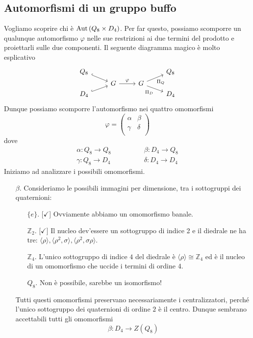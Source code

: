 \subsection{Automorfismi di un gruppo buffo}
\begin{multicols}{2}
	Vogliamo scoprire chi è $ \mathrm{Aut}\left( Q_8 \times D_4 \right) $. Per far questo, possiamo scomporre un qualunque automorfismo $ \varphi $ nelle sue restrizioni ai due termini del prodotto e proiettarli sulle due componenti. Il seguente diagramma magico è molto esplicativo
	\[ \begin{tikzcd}[row sep = 0.05 cm]
	Q_8 \arrow[swap, hook]{dr}{} & & & Q_8 \\
	 & G \arrow{r}{\varphi} & G \arrow[swap]{ur}{\Pi_Q}\arrow[swap]{dr}{\Pi_D} & \\
	D_4 \arrow[swap, hook]{ur}{} &  &  & D_4
	\end{tikzcd}\]
	Dunque possiamo scomporre l'automorfismo nei quattro omomorfismi
	\[ \varphi= \left(\begin{matrix}
	\alpha & \beta \\
	\gamma & \delta \\
	\end{matrix}\right) \]
	dove 
	\begin{align*}
		\alpha: Q_8 \rightarrow Q_8 \qquad & \qquad \beta: D_4 \rightarrow Q_8 \\
		\gamma: Q_8 \rightarrow D_4 \qquad & \qquad \delta: D_4 \rightarrow D_4
	\end{align*}
	 Iniziamo ad analizzare i possibili omomorfismi.
	 \begin{itemize}
	 	\item [$ \beta $.] Consideriamo le possibili immagini per dimensione, tra i sottogruppi dei quaternioni:
	 	\begin{itemize}
	 		\item [$\{e\}  $.][$ \checkmark $] Ovviamente abbiamo un omomorfismo banale.
	 		\item [$ \mathbb{Z}_2 $.][$ \checkmark $] Il nucleo dev'essere un sottogruppo di indice 2 e il diedrale ne ha tre: $ \langle \rho \rangle, \langle \rho^2, \sigma \rangle, \langle \rho^2, \sigma\rho \rangle $.
	 		\item [$ \mathbb{Z}_4 $.] L'unico sottogruppo di indice $ 4 $ del diedrale è $ \langle \rho \rangle \cong \mathbb{Z}_4 $ ed è il nucleo di un omomorfismo che uccide i termini di ordine $ 4 $.
	 		\item [$ Q_8 $.] Non è possibile, sarebbe un isomorfismo!
	 	\end{itemize}
	 	Tutti questi omomorfismi preservano necessariamente i centralizzatori, perché l'unico sottogruppo dei quaternioni di ordine $ 2 $ è il centro. Dunque sembrano accettabili tutti gli omomorfismi
	 	\[ \beta: D_4 \to Z(Q_8) \]
	 	

\end{itemize}
\end{multicols}
